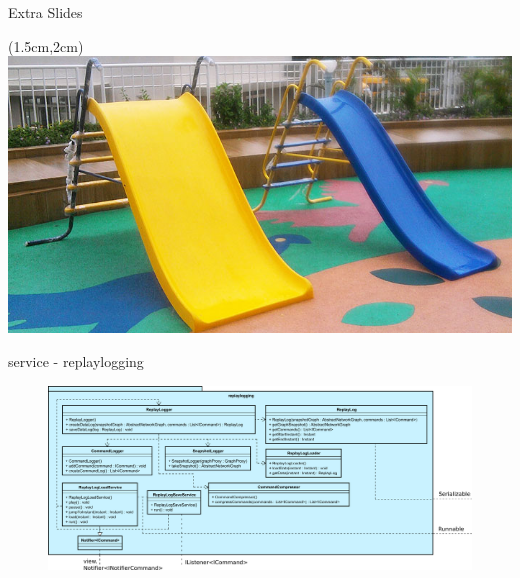 \begin{frame}{Extra Slides}
 \begin{textblock*}{5cm}(1.5cm,2cm)
  \includegraphics[scale=0.4]{./images/slides.jpg}
 \end{textblock*}
\end{frame}

\begin{frame}{service - replaylogging}
  \begin{figure}
    \centering
    \includegraphics[width=\textwidth]{./images/replaylogging.png}
  \end{figure}
\end{frame}
